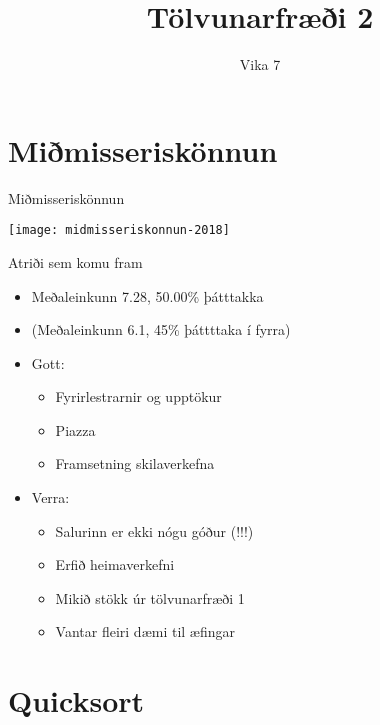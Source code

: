 \documentclass{beamer}
\title{Tölvunarfræði 2}
\subtitle{Vika 7}
\begin{document}
\begin{frame}
	\titlepage
\end{frame}

\section{Miðmisseriskönnun}

\begin{frame}{Miðmisseriskönnun}
	\begin{center}
		\texttt{[image: midmisseriskonnun-2018]}
	\end{center}
\end{frame}

\begin{frame}{Atriði sem komu fram}
	\begin{itemize}
		\item Meðaleinkunn 7.28, 50.00\% þátttakka
		\item (Meðaleinkunn 6.1, 45\% þáttttaka í fyrra)
		\item Gott:
		      \begin{itemize}
			      \item Fyrirlestrarnir og upptökur
			      \item Piazza
			      \item Framsetning skilaverkefna
		      \end{itemize}
		\item Verra:
		      \begin{itemize}
			      \item Salurinn er ekki nógu góður (!!!)
			      \item Erfið heimaverkefni
			      \item Mikið stökk úr tölvunarfræði 1
			      \item Vantar fleiri dæmi til æfingar
		      \end{itemize}
	\end{itemize}
\end{frame}

\section{Quicksort}
\end{document}
